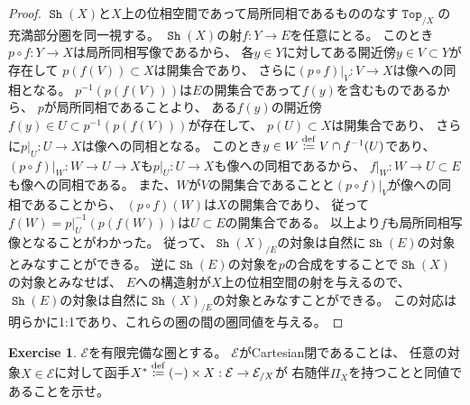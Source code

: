 \documentclass[uplatex]{jsarticle}
\theoremstyle{definition}
\newtheorem{prob}[prob]{Exercise}
\def\mcE{\mathcal{E}}
\newcommand{\dfn}{\overset{\mathrm{\tiny def}}{\coloneqq}}
\DeclareMathOperator{\sfTop}{\mathtt{Top}}
\DeclareMathOperator{\Sh}{\mathtt{Sh}}
\begin{document}
\begin{proof}
  \(\Sh(X)\)と\(X\)上の位相空間であって局所同相であるもののなす\(\sfTop_{/X}\)の充満部分圏を同一視する。
  \(\Sh(X)\)の射\(f:Y\to E\)を任意にとる。
  このとき\(p\circ f:Y\to X\)は局所同相写像であるから、
  各\(y\in Y\)に対してある開近傍\(y\in V\subset Y\)が存在して
  \(p(f(V))\subset X\)は開集合であり、
  さらに\((p\circ f)|_V : V\to X\)は像への同相となる。
  \(p^{-1}(p(f(V)))\)は\(E\)の開集合であって\(f(y)\)を含むものであるから、
  \(p\)が局所同相であることより、
  ある\(f(y)\)の開近傍\(f(y)\in U\subset p^{-1}(p(f(V)))\)が存在して、
  \(p(U)\subset X\)は開集合であり、
  さらに\(p|_U:U\to X\)は像への同相となる。
  このとき\(y\in W\dfn V\cap f^{-1}(U)\)であり、
  \((p\circ f)|_W : W\to U \to X\)も\(p|_U:U\to X\)も像への同相であるから、
  \(f|_W :W\to U\subset E\)も像への同相である。
  また、\(W\)が\(V\)の開集合であることと\((p\circ f)|_V\)が像への同相であることから、
  \((p\circ f)(W)\)は\(X\)の開集合であり、
  従って\(f(W) = p|_U^{-1}(p(f(W)))\)は\(U\subset E\)の開集合である。
  以上より\(f\)も局所同相写像となることがわかった。
  従って、\(\Sh(X)_{/E}\)の対象は自然に\(\Sh(E)\)の対象とみなすことができる。
  逆に\(\Sh(E)\)の対象を\(p\)の合成をすることで\(\Sh(X)\)の対象とみなせば、
  \(E\)への構造射が\(X\)上の位相空間の射を与えるので、
  \(\Sh(E)\)の対象は自然に\(\Sh(X)_{/E}\)の対象とみなすことができる。
  この対応は明らかに1:1であり、これらの圏の間の圏同値を与える。
\end{proof}





\begin{prob}\label{prob: 1.8}
  \(\mcE\)を有限完備な圏とする。
  \(\mcE\)がCartesian閉であることは、
  任意の対象\(X\in \mcE\)に対して函手\(X^*\dfn (-)\times X:\mcE \to \mcE_{/X}\)が
  右随伴\(\Pi_X\)を持つことと同値であることを示せ。
\end{prob}
\end{document}
